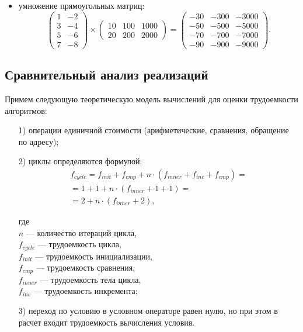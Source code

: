 \documentclass[a4paper,12pt]{article}
\begin{document}
\begin{itemize}
	\item умножение прямоугольных матриц:
	\[ \begin{pmatrix}
	1 & -2 \\
	3 & -4 \\
	5 & -6 \\
	7 & -8
	\end{pmatrix} \times 
	\begin{pmatrix}
	10 & 100 & 1000 \\
	20 & 200 & 2000
	\end{pmatrix} =
	\begin{pmatrix}
	-30 & -300 & -3000 \\
	-50 & -500 & -5000 \\
	-70 & -700 & -7000 \\
	-90 & -900 & -9000
	\end{pmatrix}. \]
	
\end{itemize}

\subsection{Сравнительный анализ реализаций}
\label{fig:cmp}

Примем следующую теоретическую модель вычислений для
оценки трудоемкости алгоритмов:

\begin{enumerate}
	\item[1)] операции единичной стоимости (арифметические, сравнения, обращение по адресу);
	\item[2)] циклы определяются формулой:
	\begin{multline}
		f_{cycle} = f_{init} + f_{cmp} + n \cdot (f_{inner} + f_{inc} + f_{cmp}) = \\
		= 1 + 1 + n \cdot (f_{inner} + 1 + 1) = \\
		= 2 + n \cdot (f_{inner} + 2),
	\end{multline}
	\begin{flushleft}
		где \\
		$n$ --- количество итераций цикла,\\ 
		$f_{cycle}$ --- трудоемкость цикла,\\
		$f_{init}$ --- трудоемкость инициализации,\\
		$f_{cmp}$ --- трудоемкость сравнения,\\
		$f_{inner}$ --- трудоемкость тела цикла,\\
		$f_{inc}$ --- трудоемкость инкремента;\\
	\end{flushleft}
	
	\item[3)] переход по условию в условном операторе равен нулю, но при этом в расчет входит трудоемкость вычисления условия. 
\end{enumerate}
\end{document}

